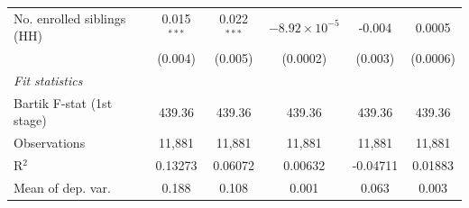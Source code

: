 \begin{tabular}{lccccc}
   No. enrolled siblings (HH)                                            & 0.015$^{***}$                        & 0.022$^{***}$                   & $-8.92\times 10^{-5}$          & -0.004                            & 0.0005\\   
                                                                         & (0.004)                              & (0.005)                         & (0.0002)                       & (0.003)                           & (0.0006)\\   
   \midrule
   \emph{Fit statistics}\\
   Bartik F-stat (1st stage)                                     & 439.36                               & 439.36                          & 439.36                         & 439.36                            & 439.36\\  
   Observations                                                          & 11,881                               & 11,881                          & 11,881                         & 11,881                            & 11,881\\  
   R$^2$                                                                 & 0.13273                              & 0.06072                         & 0.00632                        & -0.04711                          & 0.01883\\  
   Mean of dep. var.                                                     & 0.188                                & 0.108                           & 0.001                          & 0.063                             & 0.003\\  
\bottomrule
\end{tabular}
